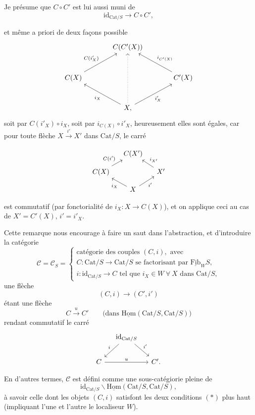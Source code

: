 \documentclass[11pt]{article}
\newcommand{\printedpage}[1]{\marginpar{\footnotesize p.~#1}}
\newcommand{\msp}[1]{\marginpar{\footnotesize [#1]}}
\newcommand{\Fib}{\underline{\mathrm{Fib}}}
\newcommand{\Hom}{\underline{\mathrm{Hom}}}
\newcommand{\Cat}{\mathrm{Cat}}
\newcommand{\id}{\mathrm{id}}
\begin{document}
Je présume que $C \circ C'$ est lui aussi muni de
\[
\mathrm{id}_{\Cat/S} \longrightarrow C \circ C',
\]

\msp{page 197}
et même a priori de deux façons possible
\[
\begin{tikzcd}[column sep=large, row sep=large]
& C(C'(X)) & \\
C(X) \arrow[ur, "C(i'_X)"] & & C'(X) \arrow[ul, "i_{C'(X)}"'] \\
& X, \arrow[ul, "i_X"] \arrow[ur, "i'_X"'] \arrow[uu, dotted] &
\end{tikzcd}
\]
soit par $C(i'_X) \circ i_X$, soit par $i_{C(X)} \circ i'_X$, heureusement elles sont égales, car pour toute flèche $X \xrightarrow{\ i'\ } X'$ dans $\Cat/S$, le carré %

\printedpage{130}

\[
\begin{tikzcd}[column sep=small, row sep=small]
 & C(X') & \\
C(X) \arrow[ur, "C(i')"] & & X' \arrow[ul, "i_{X'}"'] \\
 & X \arrow[ul, "i_X"] \arrow[ur, "i'"'] &
\end{tikzcd}
\]

est commutatif (par fonctorialité de $i_X : X \longrightarrow C(X)$), et on applique ceci au cas de $X' = C'(X)$, $i' = i'_X$.

Cette remarque nous encourage à faire un saut dans l'abstraction, et d'introduire la catégorie\msp{page 198}
\[
\mathcal{C} = \mathcal{C}_S = \begin{cases}
\text{catégorie des couples } (C,i), \text{ avec} \\
C : \Cat/S \longrightarrow \Cat/S \text{ se factorisant par } \Fib_W S, \\
i : \id_{\Cat/S} \longrightarrow C \text{ tel que } i_X \in W \ \forall\ X \text{ dans } \Cat/S,
\end{cases}
\tag*{$(*)$}
\]
une flèche
\[
(C,i) \longrightarrow (C',i')
\]
étant une flèche
\[
C \xrightarrow{u} C' \qquad \text{(dans } \Hom(\Cat/S, \Cat/S))
\]
rendant commutatif le carré 
\[
\begin{tikzcd}[column sep=small]
 & \id_{\Cat/S} \arrow[dl, "i"'] \arrow[dr, "i'"] & \\
C \arrow[rr, "u"] & & C'.
\end{tikzcd}
\]

En d'autres termes, $\mathcal{C}$ est défini comme une sous-catégiorie pleine de %
\[
\id_{\Cat/S}\backslash\Hom(\Cat/S, \Cat/S),
\]
à savoir celle dont les objets $(C,i)$ satisfont les deux conditions $(*)$ plus haut (impliquant l'une et l'autre le localiseur $W$).
\end{document}
